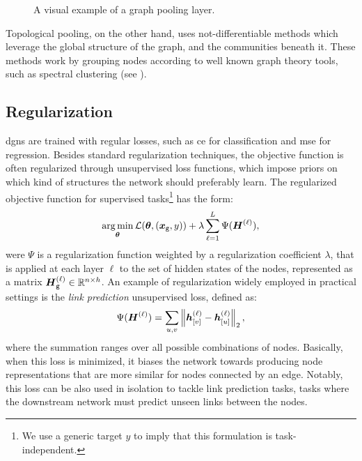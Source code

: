 \begin{figure*}[h!]
    \centering
    \resizebox{.8\textwidth}{!}{}
    \caption{A visual example of a graph pooling layer.}
    \label{fig:pooling}
\end{figure*}
Topological pooling, on the other hand,  uses not-differentiable methods which leverage the global structure of the graph, and the communities beneath it. These methods work by grouping nodes according to well known graph theory tools, such as spectral clustering (see \eg \citet{vonluxburg2007tutorialspectralclustering, dhillon2007weightedgraphcuts}).

\subsection{Regularization}
\glspl{dgn} are trained with regular losses, such as \gls{ce} for classification and \gls{mse} for regression. Besides standard regularization techniques, the objective function is often regularized through unsupervised loss functions, which impose priors on which kind of structures the network should preferably learn. The regularized objective function for supervised tasks\footnote{We use a generic target $y$ to imply that this formulation is task-independent.} has the form:
$$\argmin_{\Param} \Loss(\Param, (\Vector{x}_{\Graph{g}}, y)) + \lambda \sum_{\ell=1}^L \Psi(\LayerStateMat{\ell}),$$
were $\Psi$ is a regularization function weighted by a regularization coefficient $\lambda$, that is applied at each layer $\ell$ to the set of hidden states of the nodes, represented as a matrix $\Matrix{h}_{{\Graph{g}}}^{(\ell)} \in \Real^{n \times h}$. An example of regularization widely employed in practical settings is the \emph{link prediction} unsupervised loss, defined as:
\begin{align}
    \Psi(\LayerStateMat{\ell}) = \sum_{u,v} \Norm{\StateVector{v}{\ell} - \StateVector{u}{\ell}}_2,
\end{align}
where the summation ranges over all possible combinations of nodes. Basically, when this loss is minimized, it biases the network towards producing node representations that are more similar for nodes connected by an edge. Notably, this loss can be also used in isolation to tackle link prediction tasks, \ie tasks where the downstream network must predict unseen links between the nodes.

